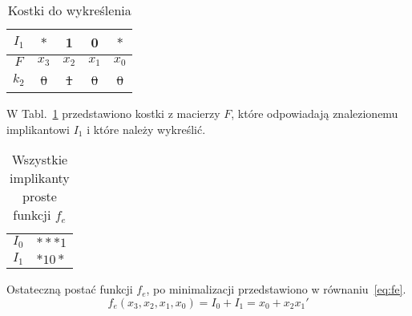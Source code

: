 \begin{table}[H]
    \centering
    \begin{tabular}[t]{ |c|c c c c| }
        \hline
        $I_1$ & $*$ & 1 & 0 & $*$ \\
        \hline\hline
        $F$ & $x_3$ & $x_2$ & $x_1$ & $x_0$ \\
        \hline
        \sout{$k_2$} & \sout{0} & \sout{1} & \sout{0} & \sout{0} \\
        \hline
    \end{tabular}
    \caption{Kostki do wykreślenia}\label{tab:die-1e}
\end{table}
W Tabl.~\ref{tab:die-1e} przedstawiono kostki z macierzy $F$, które odpowiadają znalezionemu implikantowi $I_1$
i które należy wykreślić.

\begin{table}[H]
    \centering
    \begin{tabular}[t]{ |c|c| }
        \hline
        $I_0$ & ${*}{*}{*}1$ \\
        $I_1$ & ${*}10{*}$ \\
        \hline
    \end{tabular}
    \caption{Wszystkie implikanty proste funkcji $f_e$} \label{tab:all-implicantse}
\end{table}

Ostateczną postać funkcji $f_e$, po minimalizacji przedstawiono w równaniu~\ref{eq:fe}.
\begin{equation}
    \label{eq:fe}
    f_e(x_3, x_2, x_1, x_0) = I_0 + I_1 = x_0 + x_{2}x_1'
\end{equation}
